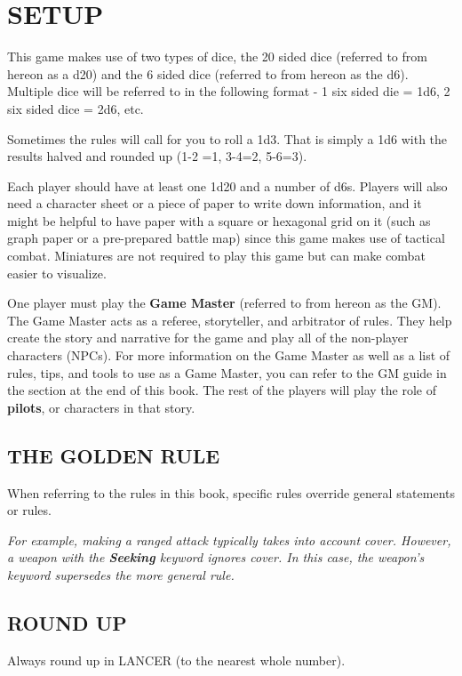 \section{SETUP}

This game makes use of two types of dice, the 20 sided dice (referred to from hereon as a d20)
and the 6 sided dice (referred to from hereon as the d6). Multiple dice will be referred to in the
following format - 1 six sided die = 1d6, 2 six sided dice = 2d6, etc.

Sometimes the rules will call for you to roll a 1d3. That is simply a 1d6 with the results halved and
rounded up (1-2 =1, 3-4=2, 5-6=3).

Each player should have at least one 1d20 and a number of d6s. Players will also need a
character sheet or a piece of paper to write down information, and it might be helpful to have
paper with a square or hexagonal grid on it (such as graph paper or a pre-prepared battle map)
since this game makes use of tactical combat. Miniatures are not required to play this game but
can make combat easier to visualize.

One player must play the \textbf{Game Master} (referred to from hereon as the GM). The Game Master
acts as a referee, storyteller, and arbitrator of rules. They help create the story and narrative for
the game and play all of the non-player characters (NPCs). For more information on the Game
Master as well as a list of rules, tips, and tools to use as a Game Master, you can refer to the GM
guide in the section at the end of this book. The rest of the players will play the role of \textbf{pilots}, or
characters in that story.

\subsection*{THE GOLDEN RULE}

When referring to the rules in this book, specific rules override general statements or rules.

\textit{For example, making a ranged attack typically takes into account cover. However, a weapon with
the \textbf{Seeking} keyword ignores cover. In this case, the weapon’s keyword supersedes the more
general rule.}

\subsection*{ROUND UP}

Always round up in LANCER (to the nearest whole number).